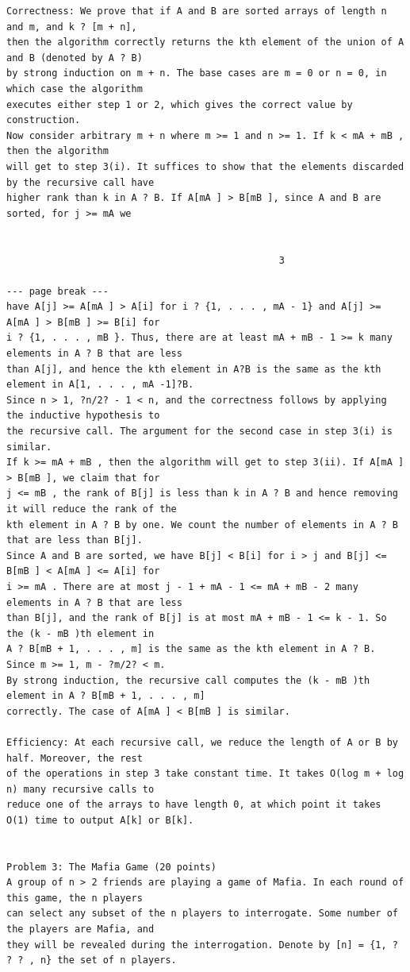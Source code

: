 \documentclass[12pt]{article}
\begin{document}
\begin{Verbatim}[breaklines=true,fontsize=\small]
Correctness: We prove that if A and B are sorted arrays of length n and m, and k ? [m + n],
then the algorithm correctly returns the kth element of the union of A and B (denoted by A ? B)
by strong induction on m + n. The base cases are m = 0 or n = 0, in which case the algorithm
executes either step 1 or 2, which gives the correct value by construction.
Now consider arbitrary m + n where m >= 1 and n >= 1. If k < mA + mB , then the algorithm
will get to step 3(i). It suffices to show that the elements discarded by the recursive call have
higher rank than k in A ? B. If A[mA ] > B[mB ], since A and B are sorted, for j >= mA we


                                                3

--- page break ---
have A[j] >= A[mA ] > A[i] for i ? {1, . . . , mA - 1} and A[j] >= A[mA ] > B[mB ] >= B[i] for
i ? {1, . . . , mB }. Thus, there are at least mA + mB - 1 >= k many elements in A ? B that are less
than A[j], and hence the kth element in A?B is the same as the kth element in A[1, . . . , mA -1]?B.
Since n > 1, ?n/2? - 1 < n, and the correctness follows by applying the inductive hypothesis to
the recursive call. The argument for the second case in step 3(i) is similar.
If k >= mA + mB , then the algorithm will get to step 3(ii). If A[mA ] > B[mB ], we claim that for
j <= mB , the rank of B[j] is less than k in A ? B and hence removing it will reduce the rank of the
kth element in A ? B by one. We count the number of elements in A ? B that are less than B[j].
Since A and B are sorted, we have B[j] < B[i] for i > j and B[j] <= B[mB ] < A[mA ] <= A[i] for
i >= mA . There are at most j - 1 + mA - 1 <= mA + mB - 2 many elements in A ? B that are less
than B[j], and the rank of B[j] is at most mA + mB - 1 <= k - 1. So the (k - mB )th element in
A ? B[mB + 1, . . . , m] is the same as the kth element in A ? B. Since m >= 1, m - ?m/2? < m.
By strong induction, the recursive call computes the (k - mB )th element in A ? B[mB + 1, . . . , m]
correctly. The case of A[mA ] < B[mB ] is similar.

Efficiency: At each recursive call, we reduce the length of A or B by half. Moreover, the rest
of the operations in step 3 take constant time. It takes O(log m + log n) many recursive calls to
reduce one of the arrays to have length 0, at which point it takes O(1) time to output A[k] or B[k].


Problem 3: The Mafia Game (20 points)
A group of n > 2 friends are playing a game of Mafia. In each round of this game, the n players
can select any subset of the n players to interrogate. Some number of the players are Mafia, and
they will be revealed during the interrogation. Denote by [n] = {1, ? ? ? , n} the set of n players.


\end{Verbatim}
\end{document}
